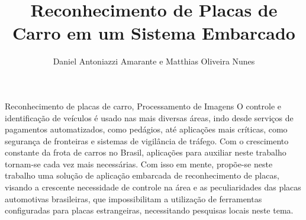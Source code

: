 \documentclass[portuguese,oneside]{tcc}
\author{Daniel Antoniazzi Amarante e Matthias Oliveira Nunes}
\title{Reconhecimento de Placas de Carro em um Sistema Embarcado}
      {Car License Plate Recognition in a Embedded System}
\begin{document}







\begin{resumo}{Reconhecimento de placas de carro, Processamento de Imagens}
O controle e identificação de veículos é usado nas mais diversas áreas, indo
desde serviços de pagamentos automatizados, como pedágios, até aplicações
mais críticas, como segurança de fronteiras e sistemas de vigilância de
tráfego. Com o crescimento constante da frota de carros no Brasil,
aplicações para auxiliar neste trabalho tornam-se cada vez mais necessárias.
Com isso em mente, propõe-se neste trabalho uma solução de aplicação
embarcada de reconhecimento de placas, visando a crescente necessidade de
controle na área e as peculiaridades das placas automotivas brasileiras, que
impossibilitam a utilização de ferramentas configuradas para placas
estrangeiras, necessitando pesquisas locais neste tema.
\end{resumo}
\end{document}
